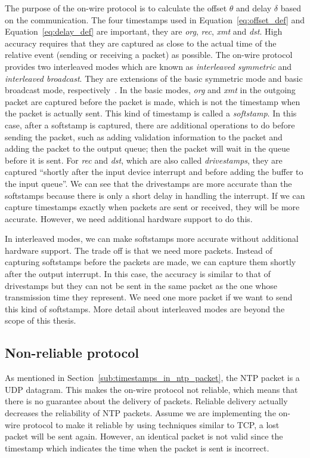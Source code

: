 The purpose of the on-wire protocol is to calculate the offset $\theta$ and
delay $\delta$ based on the communication. The four timestamps used in
Equation~\ref{eq:offset_def} and Equation~\ref{eq:delay_def} are important,
they are \emph{org}, \emph{rec}, \emph{xmt} and \emph{dst}.  High accuracy
requires that they are captured as close to the actual time of the relative
event (sending or receiving a packet) as possible. The on-wire protocol
provides two interleaved modes which are known as \emph{interleaved symmetric}
and \emph{interleaved broadcast}. They are extensions of the basic symmetric
mode and basic broadcast mode, respectively~\cite{on_wire}.
%
In the basic modes, \emph{org} and \emph{xmt} in the outgoing packet are
captured before the packet is made, which is not the timestamp when the packet
is actually sent. 
This kind of timestamp is called a \emph{softstamp}. In this case, 
after a softstamp is captured, there are additional operations to do before
sending the packet, such as adding validation information to the packet and
adding the packet to the output queue; then the packet will wait in the queue
before it is sent.  For \emph{rec} and \emph{dst}, which are also called
\emph{drivestamps}, they are captured ``shortly after the input device
interrupt and before adding the buffer to the input queue''\cite{on_wire}. We
can see that the drivestamps are more accurate than the softstamps because
there is only a short delay in handling the interrupt. If we can capture
timestamps exactly when packets are sent or received, they will be more
accurate. However, we need additional hardware support to do this.

In interleaved modes, we can make softstamps more accurate without
additional hardware support. The trade off is that we need more packets.
Instead of capturing softstamps before the packets are made, we can capture
them shortly after the output interrupt. In this case, the accuracy is similar
to that of drivestamps but they can not be sent in the same packet as the one
whose transmission time they represent. We need one more packet if we want to
send this kind of softstamps. More detail about interleaved modes are beyond
the scope of this thesis.

\subsection{Non-reliable protocol}%
\label{sub:non_reliable_protocol}
As mentioned in Section~\ref{sub:timestamps_in_ntp_packet}, the NTP packet is a
UDP datagram. This makes the on-wire protocol not reliable, which means that
there is no guarantee about the delivery of packets. Reliable delivery actually
decreases the reliability of NTP packets. Assume we are implementing the
on-wire protocol to make it reliable by using techniques similar to TCP, a lost
packet will be sent again. However, an identical packet is not valid since the
timestamp which indicates the time when the packet is sent is incorrect.

